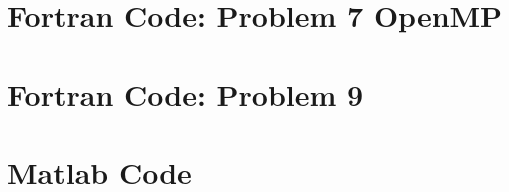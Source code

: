 \documentclass[conf]{new-aiaa}
\begin{document}
\section*{Fortran Code: Problem 7 OpenMP}

\newpage

\section*{Fortran Code: Problem 9}

\newpage

\section*{Matlab Code}

\lstset{
  style      = Matlab-editor,
  basicstyle = \mlttfamily,
}

\end{document}
